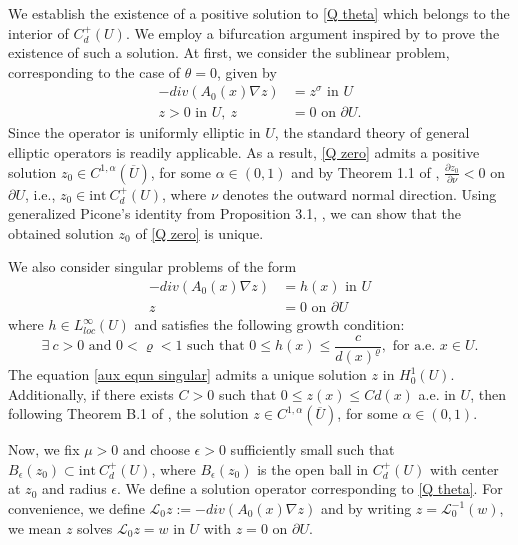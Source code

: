 \documentclass[reqno,oneside]{amsart}
\theoremstyle{definition}
\theoremstyle{remark}
\numberwithin{equation}{section}
\newcommand{\pa}{\partial}
\newcommand{\na} {\nabla}
\newcommand{\si}{\sigma}
\newcommand{\ball}{B_{\epsilon} (z_0)}
\newcommand{\li}{\mathcal{L}_0^{-1}}
\begin{document}
We establish the existence of a positive solution to \eqref{Q theta} which belongs to the interior of $C_d^+(U).$  We employ a bifurcation argument inspired by  \cite{giacomoni2019existence} to prove the existence of such a solution. At first, we consider the sublinear problem, corresponding to the case of $\theta = 0$, given by
\begin{equation}\tag{$Q_0$}\label{Q zero}
    \begin{aligned}
        -div \left(A_0 (x) \na z \right) &= z^{\si} \text{ in } U\\
        z >0 \text{ in } U,\ z &= 0 \text{ on } \pa U.
    \end{aligned}
\end{equation}
Since the operator is uniformly elliptic in $U$, the standard theory of general elliptic operators is readily applicable. As a result, \eqref{Q zero} admits a positive solution $z_0 \in C^{1, \alpha} (\overline{U})$, for some $\alpha \in (0,1)$ and by Theorem 1.1 of \cite{de2015hopf}, $\frac{\pa z_0}{\pa\nu}<0$ on $\pa U$, i.e., $z_0 \in \text{int} \ C_d^+ (U)$, where $\nu$ denotes the outward normal direction. Using generalized Picone's identity from Proposition 3.1, \cite{pinchover2015criticality}, we can show that the obtained solution $z_0$ of \eqref{Q zero} is unique. 

We also consider singular problems of the form
\begin{equation}\label{aux equn singular}
    \begin{aligned}
        -div \left(A_0(x) \na z \right) &= h(x) \text{ in } U\\
        z &= 0 \text{ on } \pa U
    \end{aligned}
\end{equation}
where $h\in L^{\infty}_{loc}(U)$ and satisfies the following growth condition:
\[\exists\ c>0 \text{ and } 0<\varrho<1 \text{ such that } 0\leq h(x) \leq \frac{c}{d(x)^{\varrho}}, \text{ for a.e. } x\in U.\]
The equation \eqref{aux equn singular} admits a unique solution $z$ in $H^1_0(U)$. Additionally, if there exists $C>0$ such that $0\leq z(x) \leq Cd(x)$ a.e. in $U$, then following Theorem B.1 of \cite{giacomoni2007sobolev}, the solution $z \in C^{1, \alpha} (\overline{U})$, for some $\alpha \in (0,1)$.

Now, we fix $\mu>0$ and choose $\epsilon >0$ sufficiently small such that $B_{\epsilon} (z_0) \subset \text{int}\ C_d^+ (U)$, where $\ball$ is the open ball in $C_d^+ (U)$ with center at $z_0$ and radius $\epsilon$. We define a solution operator corresponding to \eqref{Q theta}. For convenience, we define $\mathcal{L}_0 z := -div \left(A_0 (x) \na z \right)$ and by writing $z= \li (w)$, we mean $z$ solves $\mathcal{L}_0 z = w$ in $U$ with $z=0$ on $\pa U$.
\end{document}
